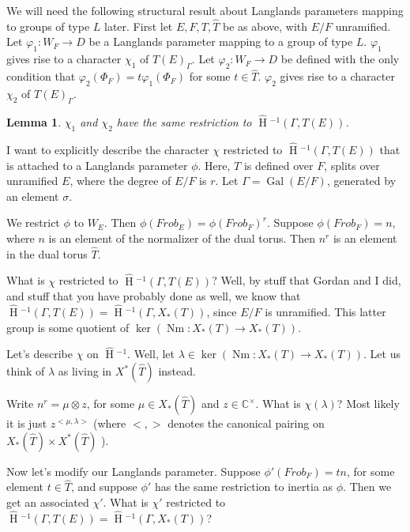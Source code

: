 \documentclass[11pt]{amsart}
\theoremstyle{plain}
\newtheorem{lemma}[theorem]{Lemma}
\newcommand{\HT}[1]{\hat{\HH}{}^{#1}}
\theoremstyle{definition}
\DeclareMathOperator{\Gal}{Gal}
\DeclareMathOperator{\HH}{H}
\DeclareMathOperator{\Nm}{Nm}
\begin{document}
We will need the following structural result about Langlands
parameters mapping to groups of type $L$ later.  First let $E,F,T,\hat{T}$
be as above, with $E/F$ unramified.  Let $\varphi_1 : W_F \rightarrow D$
be a Langlands parameter mapping to a group of type $L$.  $\varphi_1$
gives rise to a character $\chi_1$ of $T(E)_{\Gamma}$.  Let $\varphi_2
: W_F \rightarrow D$ be defined with the only condition that
$\varphi_2(\Phi_F) = t \varphi_1(\Phi_F)$ for some $t \in \hat{T}$.
$\varphi_2$ gives rise to a character $\chi_2$ of $T(E)_{\Gamma}$.

\begin{lemma}\label{toralmodification}
$\chi_1$ and $\chi_2$ have the same restriction to $\HT{-1}(\Gamma, T(E))$.
\end{lemma}

\proof
I want to explicitly describe the character $\chi$ restricted to
$\HT{-1}(\Gamma, T(E))$ that is attached to a Langlands parameter
$\phi$.  Here, $T$ is defined over $F$, splits over unramified $E$,
where the degree of $E/F$ is $r$.  Let $\Gamma = \Gal(E/F)$, generated
by an element $\sigma$.

We restrict $\phi$ to $W_E$.  Then $\phi(Frob_E) = \phi(Frob_F)^r$.
Suppose $\phi(Frob_F) = n$, where $n$ is an element of the normalizer
of the dual torus.  Then $n^r$ is an element in the dual torus
$\hat{T}$.

What is $\chi$ restricted to $\HT{-1}(\Gamma, T(E))$?  Well, by
stuff that Gordan and I did, and stuff that you have probably done as
well, we know that $\HT{-1}(\Gamma, T(E)) = \HT{-1}(\Gamma, X_*(T))$,
since $E/F$ is unramified.  This latter group is some quotient of
$\ker(\Nm : X_*(T) \rightarrow X_*(T))$.

Let's describe $\chi$ on $\HT{-1}$.  Well, let
$\lambda \in \ker(\Nm : X_*(T) \rightarrow X_*(T))$.  Let us think of
$\lambda$ as living in $X^*(\hat{T})$ instead.

Write $n^r = \mu \otimes z$, for some $\mu \in X_*(\hat{T})$ and
$z \in \mathbb{C}^\times$.  What is $\chi(\lambda)$?  Most likely it is
just $z^{<\mu, \lambda>}$ (where $< , >$ denotes the canonical pairing
on $X_*(\hat{T}) \times X^*(\hat{T})$ ).

Now let's modify our Langlands parameter.  Suppose
$\phi'(Frob_F) = tn$, for some element $t \in \hat{T}$, and suppose
$\phi'$ has the same restriction to inertia as $\phi$.  Then we get an
associated $\chi'$.  What is $\chi'$ restricted to
$\HT{-1}(\Gamma, T(E)) = \HT{-1}(\Gamma, X_*(T))$?
\end{document}
